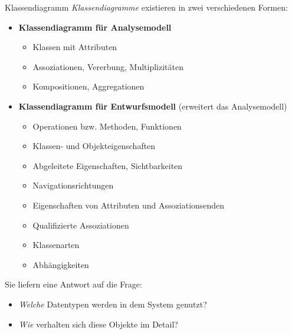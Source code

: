 \begin{defi}{Klassendiagramm}
    \emph{Klassendiagramme} existieren in zwei verschiedenen Formen:

    \begin{itemize}
        \item \textbf{Klassendiagramm für Analysemodell}
              \begin{itemize}
                  \item Klassen mit Attributen
                  \item Assoziationen, Vererbung,  Multiplizitäten
                  \item Kompositionen, Aggregationen
              \end{itemize}
        \item \textbf{Klassendiagramm für Entwurfsmodell} (erweitert das Analysemodell)
              \begin{itemize}
                  \item Operationen bzw. Methoden, Funktionen
                  \item Klassen- und Objekteigenschaften
                  \item Abgeleitete Eigenschaften, Sichtbarkeiten
                  \item Navigationsrichtungen
                  \item Eigenschaften von Attributen und Assoziationsenden
                  \item Qualifizierte Assoziationen
                  \item Klassenarten
                  \item Abhängigkeiten
              \end{itemize}
    \end{itemize}

    Sie liefern eine Antwort auf die Frage:
    \begin{itemize}
        \item \emph{Welche} Datentypen werden in dem System genutzt?
        \item \emph{Wie} verhalten sich diese Objekte im Detail?
    \end{itemize}
\end{defi}


